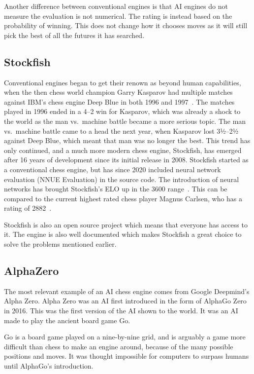 Another difference between conventional engines is that AI engines do not measure the evaluation is not numerical.
The rating is instead based on the probability of winning.
This does not change how it chooses moves as it will still pick the best of all the futures it has searched.

\subsection{Stockfish}\label{subsec:stockfish}

Conventional engines began to get their renown as beyond human capabilities, when the then chess world champion
Garry Kasparov had multiple matches against IBM's chess engine Deep Blue in both 1996 and
1997~\cite{Garry-Kasparov-vs-Deep-Blue}.
The matches played in 1996 ended in a 4--2 win for Kasparov, which was already a shock to the world as the man vs.\
machine battle became a more serious topic.
The man vs.\ machine battle came to a head the next year, when Kasparov lost 3½--2½ against Deep Blue, which meant that
man was no longer the best.
This trend has only continued, and a much more modern chess engine, Stockfish, has emerged after 16 years of development
since its initial release in 2008.
Stockfish started as a conventional chess engine, but has since 2020 included neural network
evaluation (NNUE Evaluation) in the source code.
The introduction of neural networks has brought Stockfish's ELO up in the 3600 range~\cite{Stockfish}.
This can be compared to the current highest rated chess player Magnus Carlsen, who has a
rating of 2882~\cite{highest-ELO-chess-player}.

Stockfish is also an open source project which means that everyone has access to it.
The engine is also well documented which makes Stockfish a great choice to solve the problems mentioned earlier.

\subsection{AlphaZero}\label{subsec:alphazero}

The most relevant example of an AI chess engine comes from Google Deepmind's Alpha Zero.
Alpha Zero was an AI first introduced in the form of AlphaGo Zero in 2016.
This was the first version of the AI shown to the world.
It was an AI made to play the ancient board game Go.

Go is a board game played on a nine-by-nine grid, and is arguably a game more difficult than chess to make an engine
around, because of the many possible positions and moves.
It was thought impossible for computers to surpass humans until AlphaGo's introduction.

